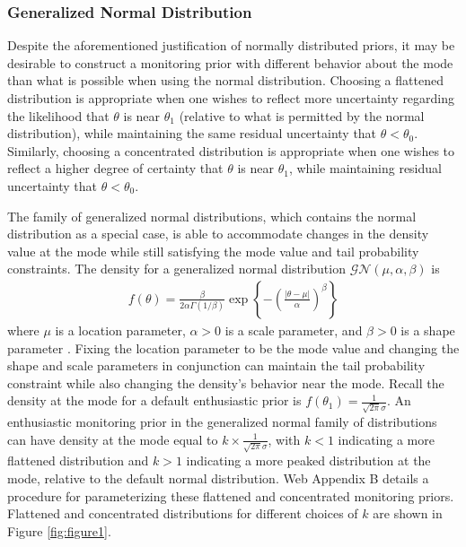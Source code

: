 \documentclass[AMA,STIX1COL,doublespace]{WileyNJD-v2}
\begin{document}
\subsubsection{Generalized Normal Distribution}\label{sec:gen_normal}
Despite the aforementioned justification of normally distributed priors, it may be desirable to construct a monitoring prior with different behavior about the  mode than what is possible when using the normal distribution. 
%
Choosing a flattened distribution is appropriate {when one wishes to reflect more uncertainty regarding the likelihood that 
$\theta$ is near $\theta_1$ (relative to what is permitted by the normal distribution), while maintaining the same residual uncertainty 
that $\theta<\theta_0$}. 
%
Similarly, choosing a concentrated distribution is appropriate {when one wishes to reflect} a higher 
degree of certainty that $\theta$ is near $\theta_1$, while maintaining residual uncertainty that $\theta<\theta_0$. 
%

The family of generalized normal distributions, which contains the normal distribution as a special case, is able to accommodate changes in the density value at the mode while still satisfying the mode value and tail probability constraints. 
%
The density for a generalized normal distribution $\mathcal{GN}(\mu,\alpha,\beta)$ is
\begin{align*}
f(\theta)=\frac{\beta}{2\alpha\Gamma(1/\beta)}\exp\left\{-\left(\frac{|\theta-\mu|}{\alpha}\right)^\beta\right\}
\end{align*} where $\mu$ is a location parameter, $\alpha>0$ is a scale parameter, and $\beta>0$ is a shape parameter \citep{Nadarajah2005}. Fixing the location parameter to be the mode value and changing the shape and scale parameters in conjunction can maintain the tail probability constraint while also changing the density's behavior near the mode. 
%
Recall the density at the mode for a default enthusiastic prior is $f(\theta_1)=\frac{1}{\sqrt{2\pi}\sigma}$. 
%
An enthusiastic monitoring prior in the generalized normal family of distributions can have density at the mode equal to $k\times \frac{1}{\sqrt{2\pi}\sigma}$, with $k<1$ indicating a more flattened distribution and $k>1$ indicating a more peaked distribution at the mode, relative to the default normal distribution. 
%
Web Appendix B details a procedure for parameterizing these flattened and concentrated monitoring priors. 
%
Flattened and concentrated distributions for different choices of $k$ are shown in Figure \ref{fig:figure1}. 
\end{document}
